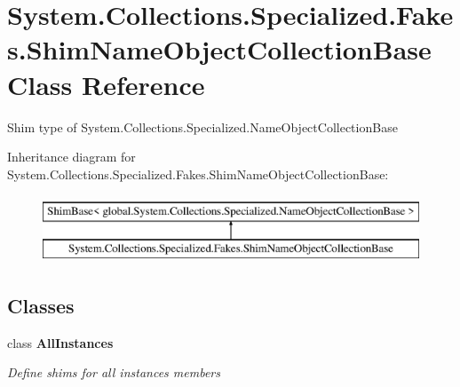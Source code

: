 \hypertarget{class_system_1_1_collections_1_1_specialized_1_1_fakes_1_1_shim_name_object_collection_base}{\section{System.\-Collections.\-Specialized.\-Fakes.\-Shim\-Name\-Object\-Collection\-Base Class Reference}
\label{class_system_1_1_collections_1_1_specialized_1_1_fakes_1_1_shim_name_object_collection_base}
}


Shim type of System.\-Collections.\-Specialized.\-Name\-Object\-Collection\-Base 


Inheritance diagram for System.\-Collections.\-Specialized.\-Fakes.\-Shim\-Name\-Object\-Collection\-Base\-:\begin{figure}[H]
\begin{center}
\leavevmode
\includegraphics[height=2.000000cm]{class_system_1_1_collections_1_1_specialized_1_1_fakes_1_1_shim_name_object_collection_base}
\end{center}
\end{figure}
\subsection*{Classes}
\begin{DoxyCompactItemize}
\item 
class {\bfseries All\-Instances}
\begin{DoxyCompactList}\small\item\em Define shims for all instances members\end{DoxyCompactList}\end{DoxyCompactItemize}

